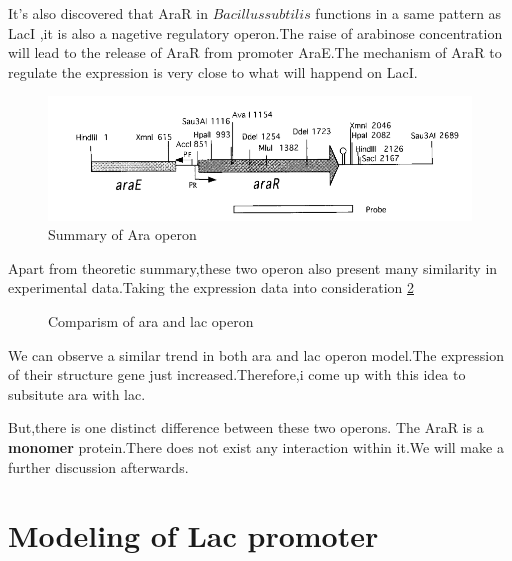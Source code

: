 \documentclass[a4paper,10pt,twocolumn]{article}
\begin{document}
    It's also discovered that AraR in $Bacillus subtilis$ functions in a same pattern as LacI ,it is also a nagetive regulatory operon.The raise of arabinose
    concentration will lead to the release of AraR from promoter AraE.The mechanism of AraR to regulate the expression is very close to what will happend on LacI.
    \begin{figure}
        \includegraphics[width=\linewidth]{Picture/ara.png} %
        \caption{Summary of Ara operon} %
        \label{ara} %
    \end{figure}

    Apart from theoretic summary,these two operon also present many similarity in experimental data.Taking the expression data into consideration \ref{compare}
    \begin{figure}
    \caption{Comparism of ara and lac operon}
    \label{compare}
    \end{figure}
    We can observe a similar trend in both ara and lac operon model.The expression of their structure gene just increased.Therefore,i come up with this idea to subsitute ara with lac.
    
    But,there is one distinct difference between these two operons.
    The AraR is a \textbf{monomer} protein.There does not exist any interaction within it.We will make a further discussion afterwards.

    \section{Modeling of Lac promoter}
    
\end{document}
